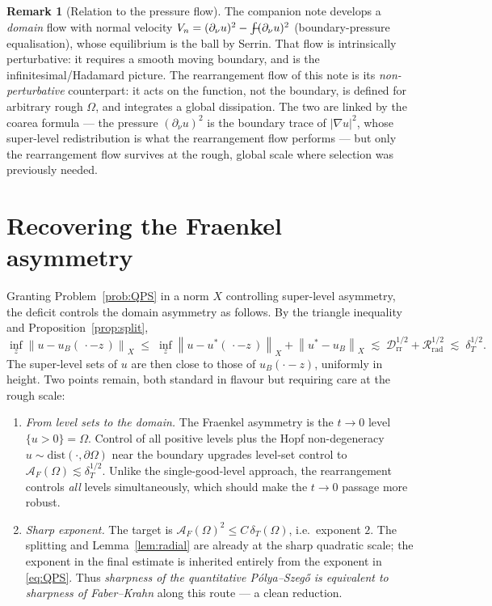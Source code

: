 \documentclass[11pt]{article}
\theoremstyle{definition}
\newtheorem{remark}[theorem]{Remark}
\newcommand{\Om}{\Omega}
\newcommand{\Drr}{\mathcal D_{\mathrm{rr}}}
\newcommand{\Rrad}{\mathcal R_{\mathrm{rad}}}
\newcommand{\dT}{\delta_T}
\newcommand{\AF}{\mathcal A_F}
\newcommand{\fint}{\,\rlap{$-$}\!\!\int}
\newcommand{\norm}[1]{\left\|#1\right\|}
\begin{document}
\begin{remark}[Relation to the pressure flow]
The companion note develops a \emph{domain} flow with normal velocity
$V_n=(\partial_\nu u)^2-\fint(\partial_\nu u)^2$ (boundary-pressure
equalisation), whose equilibrium is the ball by Serrin. That flow is
intrinsically perturbative: it requires a smooth moving boundary, and is the
infinitesimal/Hadamard picture. The rearrangement flow of this note is its
\emph{non-perturbative} counterpart: it acts on the function, not the
boundary, is defined for arbitrary rough $\Om$, and integrates a global
dissipation. The two are linked by the coarea formula --- the pressure
$(\partial_\nu u)^2$ is the boundary trace of $|\nabla u|^2$, whose
super-level redistribution is what the rearrangement flow performs --- but
only the rearrangement flow survives at the rough, global scale where
selection was previously needed.
\end{remark}

\section{Recovering the Fraenkel asymmetry}
\label{sec:asymmetry}

Granting Problem~\ref{prob:QPS} in a norm $X$ controlling super-level
asymmetry, the deficit controls the domain asymmetry as follows. By the
triangle inequality and Proposition~\ref{prop:split},
\[
   \inf_z\norm{u-u_B(\,\cdot-z\,)}_X
   \;\le\;\inf_z\norm{u-u^*(\,\cdot-z\,)}_X+\norm{u^*-u_B}_X
   \;\lesssim\;\Drr^{1/2}+\Rrad^{1/2}\;\lesssim\;\dT^{1/2}.
\]
The super-level sets of $u$ are then close to those of $u_B(\cdot-z)$,
uniformly in height. Two points remain, both standard in flavour but
requiring care at the rough scale:
\begin{enumerate}[label=\textup{(\roman*)}]
\item \emph{From level sets to the domain.} The Fraenkel asymmetry is the
$t\to0$ level $\{u>0\}=\Om$. Control of all positive levels plus the Hopf
non-degeneracy $u\sim\mathrm{dist}(\cdot,\partial\Om)$ near the boundary
upgrades level-set control to $\AF(\Om)\lesssim\dT^{1/2}$. Unlike the
single-good-level approach, the rearrangement controls \emph{all} levels
simultaneously, which should make the $t\to0$ passage more robust.
\item \emph{Sharp exponent.} The target is $\AF(\Om)^2\le C\,\dT(\Om)$,
i.e.\ exponent $2$. The splitting and Lemma~\ref{lem:radial} are already at
the sharp quadratic scale; the exponent in the final estimate is inherited
entirely from the exponent in \eqref{eq:QPS}. Thus \emph{sharpness of the
quantitative Pólya--Szegő is equivalent to sharpness of Faber--Krahn} along
this route --- a clean reduction.
\end{enumerate}
\end{document}
